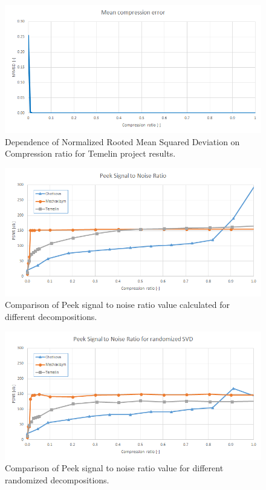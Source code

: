 \begin{figure}[ht]
\centering\includegraphics[width=\textwidth]{figures/temelin_NRMSD}
\caption{Dependence of Normalized Rooted Mean Squared Deviation on Compression ratio for Temelin project results.}
\label{fig:temelin:NRMSD}
\end{figure}

\begin{figure}[ht]
\centering\includegraphics[width=\textwidth]{figures/PSNR}
\caption{Comparison of Peek signal to noise ratio value calculated for different decompositions.}
\label{fig:PSNR}
\end{figure}

\begin{figure}[ht]
\centering\includegraphics[width=\textwidth]{figures/PSNR_rand}
\caption{Comparison of Peek signal to noise ratio value for different randomized decompositions.}
\label{fig:PSNR_rand}
\end{figure}

